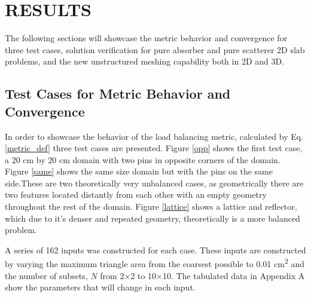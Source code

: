 
\chapter{\uppercase {Results}}
\label{ch:results}

The following sections will showcase the metric behavior and convergence for three test cases, solution verification for pure absorber and pure scatterer 2D slab problems, and the new unstructured meshing capability both in 2D and 3D.

\section{Test Cases for Metric Behavior and Convergence}
\label{sec:convergence}
In order to showcase the behavior of the load balancing metric, calculated by Eq. \ref{metric_def} three test cases are presented. Figure \ref{opp} shows the first test case, a 20 cm by 20 cm domain with two pins in opposite corners of the domain. Figure \ref{same} shows the same size domain but with the pins on the same side.These are two theoretically very unbalanced cases, as geometrically there are two features located distantly from each other with an empty geometry throughout the rest of the domain. Figure \ref{lattice} shows a lattice and reflector, which due to it's denser and repeated geometry, theoretically is a more balanced problem. 

A series of 162 inputs was constructed for each case. These inputs are constructed by varying the maximum triangle area from the coarsest possible to 0.01 cm\textsuperscript{2} and the number of subsets, $N$ from 2$\times$2 to 10$\times$10. The tabulated data in Appendix A show the parameters that will change in each input. 

